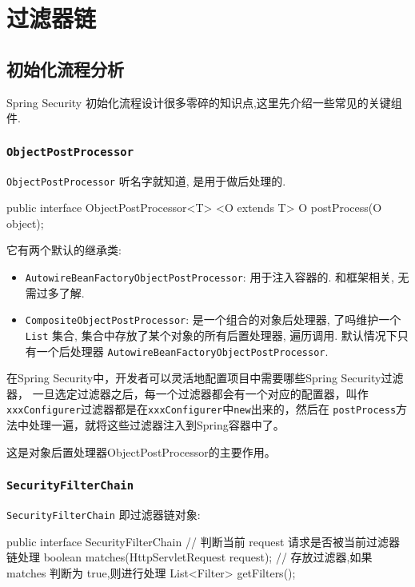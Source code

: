 \section{过滤器链}
\subsection{初始化流程分析}

Spring Security 初始化流程设计很多零碎的知识点,这里先介绍一些常见的关键组件.

\subsubsection*{\texttt{ObjectPostProcessor}}

\texttt{ObjectPostProcessor} 听名字就知道, 是用于做后处理的.

\begin{Java}
public interface ObjectPostProcessor<T> {
    <O extends T> O postProcess(O object);
}
\end{Java}

它有两个默认的继承类:

\begin{itemize}
  \item \texttt{AutowireBeanFactoryObjectPostProcessor}: 用于注入容器的. 和框架相关, 无需过多了解.
  \item \texttt{CompositeObjectPostProcessor}: 是一个组合的对象后处理器, 了吗维护一个 \texttt{List} 集合, 集合中存放了某个对象的所有后置处理器, 遍历调用. 默认情况下只有一个后处理器 \texttt{AutowireBeanFactoryObjectPostProcessor}.
\end{itemize}

在Spring Security中，开发者可以灵活地配置项目中需要哪些Spring Security过滤器，
一旦选定过滤器之后，每一个过滤器都会有一个对应的配置器，叫作\texttt{xxxConfigurer}过滤器都是在\texttt{xxxConfigurer}中\texttt{new}出来的，然后在 \texttt{postProcess}方法中处理一遍，就将这些过滤器注入到Spring容器中了。

这是对象后置处理器ObjectPostProcessor的主要作用。

\subsubsection*{\texttt{SecurityFilterChain}}

\texttt{SecurityFilterChain} 即过滤器链对象:

\begin{Java}
public interface SecurityFilterChain {
    // 判断当前 request 请求是否被当前过滤器链处理
    boolean matches(HttpServletRequest request);
    // 存放过滤器,如果 matches 判断为 true,则进行处理
    List<Filter> getFilters();
}
\end{Java}

